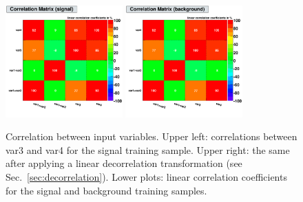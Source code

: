 \begin{figure}[t]
\begin{center}
  \vspace{0.2cm}

  \def\thissize{0.40}
  \includegraphics[width=\thissize\textwidth]{plots/CorrelationMatrixS}
  \includegraphics[width=\thissize\textwidth]{plots/CorrelationMatrixB}
\end{center}
\vspace{-0.7cm}
\caption[.]{Correlation between input variables. Upper left: correlations
         between var3 and var4 for the signal training sample.
         Upper right: the same after applying a linear decorrelation transformation
         (see Sec.~\ref{sec:decorrelation}). Lower plots:
         linear correlation coefficients for the signal and background
         training samples.
}
\label{fig:usingtmva:correlations}
\end{figure}
